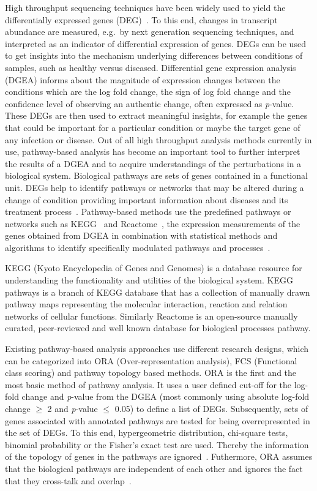 \documentclass[twocolumn]{article}
\begin{document}
High throughput sequencing techniques have been widely used to yield
the differentially expressed genes (DEG)~\cite{DEG}. To this end,
changes in transcript abundance are measured, e.g.~by next generation
sequencing techniques, and interpreted as an indicator of differential
expression of genes. DEGs can be used to get
insights into the mechanism underlying differences between conditions of samples, such as
healthy versus diseased. Differential gene
expression analysis (DGEA) informs about the magnitude of expression changes
between the conditions which are the log fold change, the sign of log fold change and the confidence level
of observing an authentic change, often expressed as
\textit{p}-value. These DEGs are
then used to extract meaningful insights, for example the genes that
could be important for a particular condition or maybe the target gene
of any infection or disease. Out of all high throughput analysis
methods currently in use, pathway-based analysis has become an
important tool to further interpret the results of a DGEA and to
acquire understandings of the perturbations in a biological
system. Biological pathways are sets of genes contained in a functional
unit. DEGs help to identify pathways or networks that may be altered
during a change of condition providing important information about
diseases and its treatment process~\cite{Khatri2012}. Pathway-based
methods use the predefined pathways or networks such as
KEGG~\cite{Kegg} and Reactome~\cite{Reactome}, the expression
measurements of the genes obtained from DGEA in combination with statistical methods and algorithms to
identify specifically modulated pathways and processes~\cite{Campos}.

KEGG (Kyoto Encyclopedia of Genes and Genomes) is a database resource for understanding the functionality and utilities of the biological system. KEGG pathways is a branch of KEGG database that has a collection of manually drawn pathway maps representing the molecular interaction, reaction and relation networks of cellular functions. Similarly Reactome is an open-source manually curated, peer-reviewed and well known  database for biological processes pathway.

Existing pathway-based analysis approaches use different research
designs, which can be categorized into ORA (Over-representation
analysis), FCS (Functional class scoring) and pathway topology based
methods. ORA is the first and the most basic method of pathway
analysis. It uses a user defined cut-off for the log-fold change and
\textit{p}-value from the DGEA (most commonly using absolute log-fold change
$\geq$ 2 and \textit{p}-value $\leq$ 0.05) to define a list of
DEGs. Subsequently, sets of genes associated
with annotated pathways are tested for being overrepresented in the
set of DEGs. To this end, hypergeometric
distribution, chi-square tests, binomial probability or the Fisher’s
exact test are used. Thereby the information of the topology of genes in the
pathways are ignored~\cite{Bayer}. Futhermore, ORA assumes that the biological
pathways are independent of each other and ignores the fact that they cross-talk and overlap~\cite{Khatri2012,Campos}.
\end{document}
